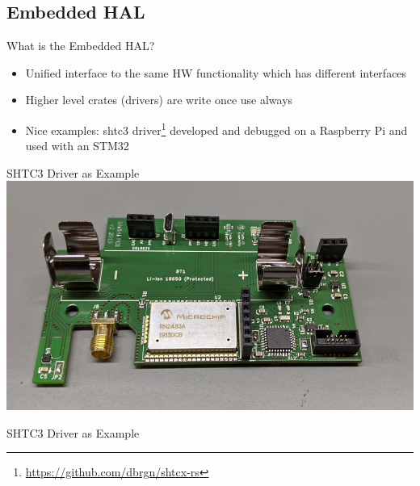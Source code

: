 \documentclass[aspectratio=1610,14pt,t]{beamer}
\begin{document}
\subsection{Embedded HAL}

\begin{frame}[c]{What is the Embedded HAL?}
  \begin{itemize}
  \item Unified interface to the same HW functionality which has different
    interfaces
  \item Higher level crates (drivers) are write once use always
  \item Nice examples: shtc3
    driver\footnote{\url{https://github.com/dbrgn/shtcx-rs}} developed and
    debugged on a  Raspberry Pi and used with an STM32
  \end{itemize}
\end{frame}

\begin{frame}[c]{SHTC3 Driver as Example}
  \includegraphics[height=0.8\textheight]{./img/gfroerli.jpg}
\end{frame}

\begin{frame}[c]{SHTC3 Driver as Example}
\end{frame}
\end{document}
